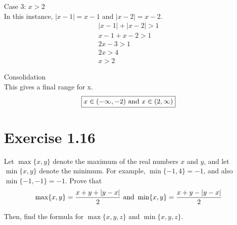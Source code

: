 \documentclass[12pt]{report}
\begin{document}
Case 3: $x > 2$\\
In this instance, $|x - 1| = x - 1$ and $|x - 2| = x - 2$.
\begin{gather}
    \left|x - 1\right| + \left|x - 2\right| > 1\\
    x - 1 + x - 2 > 1\\
    2x - 3 > 1\\
    2x > 4\\
    x > 2
\end{gather}

Consolidation\\
This gives a final range for x.
\begin{equation}
    \boxed{x \in (-\infty, -2) \text{ and } x \in (2, \infty)}
\end{equation}

\pagebreak
\section{Exercise 1.16}
Let $\max\{x, y\}$ denote the maximum of the real numbers $x$ and $y$, and let $\min\{x, y\}$ denote the minimum. 
For example, $\min\{-1, 4\} = -1$, and also $\min\{-1, -1\} = -1$. 
Prove that
\begin{gather*}
    \max\{x,y\} = \frac{x + y + \left|y - x\right|}{2}
    \text{ and }
    \min\{x,y\} = \frac{x + y - \left|y - x\right|}{2}
\end{gather*}

Then, find the formula for $\max\{x,y,z\}$ and $\min\{x,y,z\}$.
\end{document}
